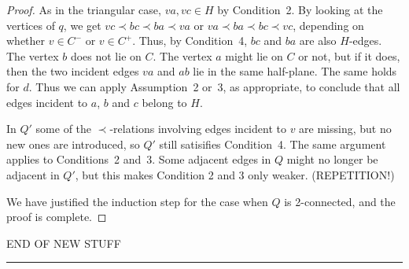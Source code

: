 \begin{proof}
As in the triangular case, $va,vc\in H$ by Condition~2.
By looking at the vertices of $q$, we get
$vc \prec bc\prec ba\prec va$ or 
$va \prec ba\prec bc\prec vc$,
 depending on whether $v\in C^-$ or
$v\in C^+$. 
Thus, by Condition~4, $bc$ and $ba$ are also $H$-edges.
The vertex $b$ does not lie on $C$.
The vertex $a$ might lie on $C$ or not, but if it does,
then the two incident edges $va$ and $ab$ lie in the same half-plane.
 The same holds for $d$.
Thus we can apply Assumption~2 or~3, as appropriate,
 to conclude that all edges incident
to $a$, $b$ and $c$ belong to $H$.


   In $Q'$ some of the $\prec$-relations involving edges incident
   to $v$ are missing, but no new ones are introduced, so $Q'$ still
   satisifies Condition~4.
The same argument applies to
Conditions~2 and~3. Some adjacent edges in $Q$ might no longer be adjacent
in $Q'$, but this makes Condition 2 and 3 only weaker. (REPETITION!)


We have justified the induction step for the case when $Q$ is
2-connected, and
   the proof is complete.
\end{proof}


END OF NEW STUFF
\hrule


